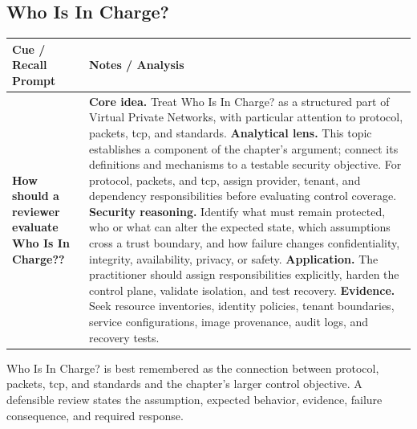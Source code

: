\documentclass[11pt]{article}
\newcommand{\CornellHeader}{%
\rowcolor{Navy}\color{white}\bfseries Cue / Recall Prompt & \color{white}\bfseries Notes / Analysis\\\hline}
\newcommand{\CornellRow}[2]{%
\cellcolor{CueGray}\RaggedRight\textbf{#1} & \RaggedRight #2\\\hline}
\begin{document}
\subsection*{Who Is In Charge?}
\begin{longtable}{>{\RaggedRight\arraybackslash}p{}|>{\RaggedRight\arraybackslash}p{}}
\CornellHeader
\CornellRow{How should a reviewer evaluate Who Is In Charge??}{\textbf{Core idea.} Treat Who Is In Charge? as a structured part of Virtual Private Networks, with particular attention to protocol, packets, tcp, and standards. \textbf{Analytical lens.} This topic establishes a component of the chapter's argument; connect its definitions and mechanisms to a testable security objective. For protocol, packets, and tcp, assign provider, tenant, and dependency responsibilities before evaluating control coverage. \textbf{Security reasoning.} Identify what must remain protected, who or what can alter the expected state, which assumptions cross a trust boundary, and how failure changes confidentiality, integrity, availability, privacy, or safety. \textbf{Application.} The practitioner should assign responsibilities explicitly, harden the control plane, validate isolation, and test recovery. \textbf{Evidence.} Seek resource inventories, identity policies, tenant boundaries, service configurations, image provenance, audit logs, and recovery tests.}
\end{longtable}
\begin{topicsummary}
Who Is In Charge? is best remembered as the connection between protocol, packets, tcp, and standards and the chapter's larger control objective. A defensible review states the assumption, expected behavior, evidence, failure consequence, and required response.
\end{topicsummary}
\end{document}

